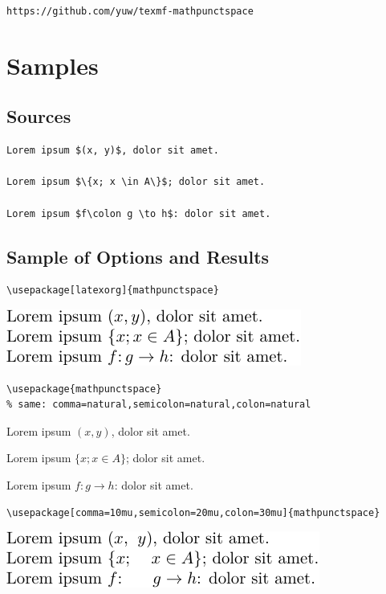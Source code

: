 \documentclass{article}
\begin{document}
\texttt{https://github.com/yuw/texmf-mathpunctspace}

\section{Samples}


\subsection{Sources}

\begin{verbatim}
Lorem ipsum $(x, y)$, dolor sit amet.

Lorem ipsum $\{x; x \in A\}$; dolor sit amet.

Lorem ipsum $f\colon g \to h$: dolor sit amet.
\end{verbatim}

\subsection{Sample of Options and Results}

\begin{verbatim}
\usepackage[latexorg]{mathpunctspace}
\end{verbatim}

\includegraphics{latexorg.pdf}

\begin{verbatim}
\usepackage{mathpunctspace}
% same: comma=natural,semicolon=natural,colon=natural
\end{verbatim}

Lorem ipsum $(x, y)$, dolor sit amet.

Lorem ipsum $\{x; x \in A\}$; dolor sit amet.

Lorem ipsum $f\colon g \to h$: dolor sit amet.

\begin{verbatim}
\usepackage[comma=10mu,semicolon=20mu,colon=30mu]{mathpunctspace}
\end{verbatim}

\includegraphics{comma10mu-semicolon20mu-colon30mu.pdf}
\end{document}

